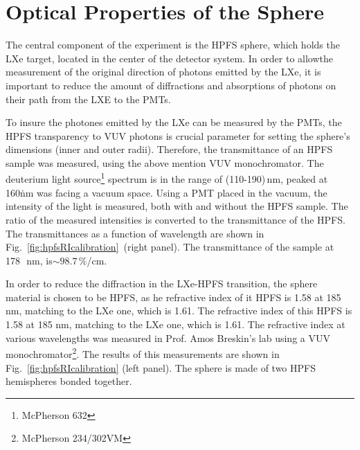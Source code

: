 \section{Optical Properties of the Sphere }
\label{sec:opt}


The central component of the experiment is the HPFS sphere, which holds the LXe target, located in the center of the detector system. In order to allowthe measurement of the original direction of photons emitted by the LXe, it is important to reduce the amount of diffractions and absorptions of photons on their path from the LXE to the PMTs.   

To insure the photones emitted by the LXe can be measured by the PMTs, the HPFS transparency to VUV photons is crucial parameter for setting the sphere's dimensions (inner and outer radii). 
Therefore, the transmittance of an HPFS sample was measured, using the above mention VUV monochromator. The deuterium light source\footnote{McPherson 632} spectrum is in the range of (110-190)\,nm, peaked at 160\.nm was facing a vacuum space. Using a PMT placed in the vacuum, the intensity of the light is measured, both with and without the HPFS sample. The ratio of the measured intensities is converted to the transmittance of the HPFS. The transmittances as a function of wavelength are shown in Fig.~\ref{fig:hpfsRIcalibration}~(right panel). The transmittance of the sample at 178~\,nm, is$\sim98.7$\,\%/cm.  

In order to reduce the diffraction in the LXe-HPFS transition, the sphere material is chosen to be HPFS, as he refractive index of it HPFS is 1.58 at 185 nm, matching to the LXe one, which is 1.61. The refractive index of this HPFS is 1.58 at 185 nm, matching to the LXe one, which is 1.61. The refractive index at various wavelengths was measured in Prof. Amos Breskin's lab using a VUV monochromator\footnote{McPherson 234/302VM}. The results of this measurements are shown in Fig.~\ref{fig:hpfsRIcalibration} (left panel). The sphere is made of two HPFS hemispheres bonded together.

